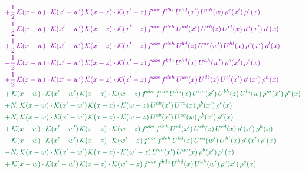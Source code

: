 \documentclass[10pt]{article}
\numberwithin{equation}{section}
\begin{document}
\begin{align}
&{\color{CC} +\frac{1}{2}\,\mathcal{K}(x-w)\cdot\mathcal{K}(x'-w')\,\mathcal{K}(x-z)\cdot\mathcal{K}(x'-z)\,f^{abc}\,f^{dbe}\,U^{hd}(x')\,U^{ah}(w)\,\rho^{e}(x')\,\rho^{c}(x)} \notag\\
&{\color{CC} -\frac{1}{2}\,\mathcal{K}(x-w)\cdot\mathcal{K}(x'-w')\,\mathcal{K}(x-z)\cdot\mathcal{K}(x'-z)\,f^{abc}\,f^{deh}\,U^{ad}(x')\,U^{eb}(z)\,U^{cl}(x)\,\rho^{h}(x')\,\rho^{l}(x)} \notag\\
&{\color{CC} +\frac{1}{2}\,\mathcal{K}(x-w)\cdot\mathcal{K}(x'-w')\,\mathcal{K}(x-z)\cdot\mathcal{K}(x'-z)\,f^{abc}\,f^{deh}\,U^{bd}(z)\,U^{ae}(w')\,U^{hl}(x)\,\rho^{c}(x')\,\rho^{l}(x)} \notag\\
&{\color{CC} -\frac{1}{2}\,\mathcal{K}(x-w)\cdot\mathcal{K}(x'-w')\,\mathcal{K}(x-z)\cdot\mathcal{K}(x'-z)\,f^{abc}\,f^{bde}\,U^{hd}(x)\,U^{ah}(w')\,\rho^{c}(x')\,\rho^{e}(x)} \notag\\
&{\color{CC} +\frac{1}{2}\,\mathcal{K}(x-w)\cdot\mathcal{K}(x'-w')\,\mathcal{K}(x-z)\cdot\mathcal{K}(x'-z)\,f^{abc}\,f^{deh}\,U^{ae}(x)\,U^{db}(z)\,U^{cl}(x')\,\rho^{l}(x')\,\rho^{h}(x)} \notag\\
&{\color{JIM} +\,\mathcal{K}(x-w)\cdot\mathcal{K}(x'-w')\,\mathcal{K}(x-z)\cdot\mathcal{K}(w-z)\,f^{abc}\,f^{cde}\,U^{hd}(x)\,U^{lm}(x')\,U^{bh}(z)\,U^{la}(w)\,\rho^{m}(x')\,\rho^{e}(x)} \notag\\
&{\color{JIM} +N_{c}\,\mathcal{K}(x-w)\cdot\mathcal{K}(x'-w')\,\mathcal{K}(x-z)\cdot\mathcal{K}(w-z)\,U^{ab}(x')\,U^{ca}(x)\,\rho^{b}(x')\,\rho^{c}(x)} \notag\\
&{\color{JIM} +N_{c}\,\mathcal{K}(x-w)\cdot\mathcal{K}(x'-w')\,\mathcal{K}(x-z)\cdot\mathcal{K}(w-z)\,U^{ab}(x')\,U^{ac}(w)\,\rho^{b}(x')\,\rho^{c}(x)} \notag\\
&{\color{JIM} +\,\mathcal{K}(x-w)\cdot\mathcal{K}(x'-w')\,\mathcal{K}(x-z)\cdot\mathcal{K}(w-z)\,f^{abc}\,f^{deh}\,U^{al}(x')\,U^{eb}(z)\,U^{cd}(x)\,\rho^{l}(x')\,\rho^{h}(x)} \notag\\
&{\color{JIM} -\,\mathcal{K}(x-w)\cdot\mathcal{K}(x'-w')\,\mathcal{K}(x-z)\cdot\mathcal{K}(w'-z)\,f^{abc}\,f^{deh}\,U^{bd}(z)\,U^{ea}(w')\,U^{hl}(x)\,\rho^{c}(x')\,\rho^{l}(x)} \notag\\
&{\color{JIM} -N_{c}\,\mathcal{K}(x-w)\cdot\mathcal{K}(x'-w')\,\mathcal{K}(x-z)\cdot\mathcal{K}(w'-z)\,U^{ab}(x')\,U^{ac}(x)\,\rho^{b}(x')\,\rho^{c}(x)} \notag\\
&{\color{JIM} +\,\mathcal{K}(x-w)\cdot\mathcal{K}(x'-w')\,\mathcal{K}(x-z)\cdot\mathcal{K}(w'-z)\,f^{abc}\,f^{bde}\,U^{hd}(x)\,U^{ah}(w')\,\rho^{c}(x')\,\rho^{e}(x)} \notag\\

\end{align}
\end{document}
